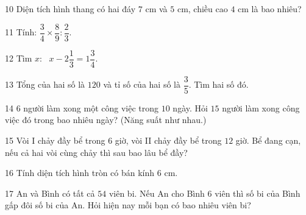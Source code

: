 \gap
\begin{probbox}{10}{\relax}
Diện tích hình thang có hai đáy $7$ cm và $5$ cm, chiều cao $4$ cm là bao nhiêu?
\end{probbox}
\begin{probbox}{11}{\relax}
Tính: $\dfrac34\times\dfrac89:\dfrac23$.
\end{probbox}
\gap
\begin{probbox}{12}{\relax}
Tìm $x$: \ $x-2\dfrac13=1\dfrac34$.
\end{probbox}
\gap
\begin{probbox}{13}{\relax}
Tổng của hai số là $120$ và tỉ số của hai số là $\dfrac35$. Tìm hai số đó.
\end{probbox}
\gap
\begin{probbox}{14}{\relax}
$6$ người làm xong một công việc trong $10$ ngày. Hỏi $15$ người làm xong công việc đó trong bao nhiêu ngày? (Năng suất như nhau.)
\end{probbox}
\gap
\begin{probbox}{15}{\relax}
Vòi I chảy đầy bể trong $6$ giờ, vòi II chảy đầy bể trong $12$ giờ. Bể đang cạn, nếu cả hai vòi cùng chảy thì sau bao lâu bể đầy?
\end{probbox}
\gap
\begin{probbox}{16}{\relax}
Tính diện tích hình tròn có bán kính $6$ cm.
\end{probbox}
\begin{probbox}{17}{}
An và Bình có tất cả $54$ viên bi. Nếu An cho Bình $6$ viên thì số bi của Bình gấp đôi số bi của An. Hỏi hiện nay mỗi bạn có bao nhiêu viên bi?
\end{probbox}
